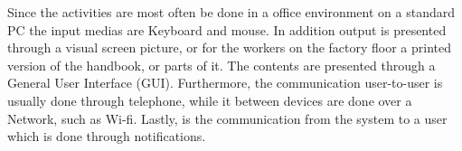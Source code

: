 Since the activities are most often be done in a office environment on a standard PC the input medias are Keyboard and mouse.
In addition output is presented through a visual screen picture, or for the workers on the factory floor a printed version of the handbook, or parts of it.
The contents are presented through a General User Interface (GUI).
Furthermore, the communication user-to-user is usually done through telephone, while it between devices are done over a Network, such as Wi-fi.
Lastly, is the communication from the system to a user which is done through notifications.

